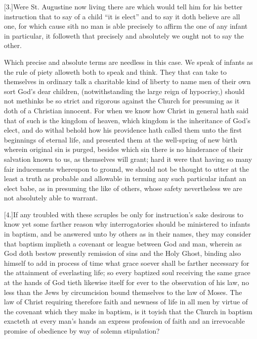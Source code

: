 [3.]Were St. Augustine now living there are which would tell him for his better instruction that to say of a child “it is elect” and to say it doth believe are all one, for which cause sith no man is able precisely to affirm the one of any infant in particular, it followeth that precisely and absolutely we ought not to say the other.

Which precise and absolute terms are needless in this case. We speak of infants as the rule of piety alloweth both to speak and think. They that can take to themselves in ordinary talk a charitable kind of liberty to name men of their own sort God’s dear children, (notwithstanding the large reign of hypocrisy,) should not methinks be so strict and rigorous against the Church for presuming as it doth of a Christian innocent. For when we know how Christ in general hath said that of such is the kingdom of heaven, which  kingdom is the inheritance of God’s elect,
 and do withal behold how his providence hath called them unto the first beginnings of eternal life, and presented them at the well-spring of new birth wherein original sin is purged, besides which sin there is no hinderance of their salvation known to us, as themselves will grant; hard it were that having so many fair inducements whereupon to ground, we should not be thought to utter at the least a truth as probable and allowable in terming any such particular infant an elect babe, as in presuming the like of others, whose safety nevertheless we are not absolutely able to warrant.

[4.]If any troubled with these scruples be only for instruction’s sake desirous to know yet some farther reason why interrogatories should be ministered to infants in baptism, and be answered unto by others as in their names, they may consider that baptism implieth a covenant or league between God and man, wherein as God doth bestow presently remission of sins and the Holy Ghost, binding also himself to add in process of time what grace soever shall be farther necessary for the attainment of everlasting life; so every baptized soul receiving the same grace at the hands of God tieth likewise itself for ever to the observation of his law, no less than the Jews by circumcision bound themselves to the law of Moses. The law of Christ requiring therefore faith and newness of life in all men by virtue of the covenant which they make in baptism, is it toyish that the Church in baptism exacteth at every man’s hands an express profession of faith and an irrevocable promise of obedience by way of solemn stipulation?



